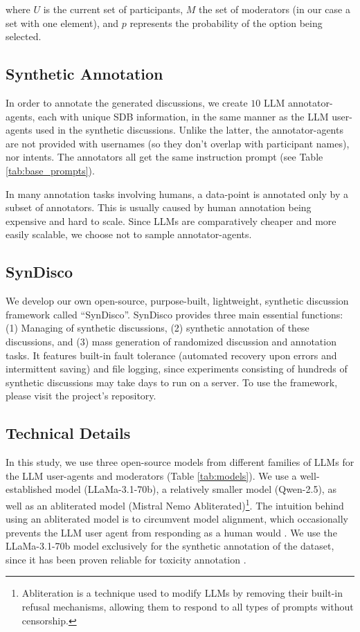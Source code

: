 \noindent where $U$ is the current set of participants, $M$ the set of moderators (in our case a set with one element), and $p$ represents the probability of the option being selected.


\subsection{Synthetic Annotation}

In order to annotate the generated discussions, we create $10$ \ac{LLM} annotator-agents, each with unique \ac{SDB} information, in the same manner as the \ac{LLM} user-agents used in the synthetic discussions. Unlike the latter, the annotator-agents are not provided with usernames (so they don't overlap with participant names), nor intents. The annotators all get the same instruction prompt (see Table \ref{tab:base_prompts}).

In many annotation tasks involving humans, a data-point is annotated only by a subset of annotators. This is usually caused by human annotation being expensive and hard to scale. Since \acp{LLM} are comparatively cheaper and more easily scalable, we choose not to sample annotator-agents.


\subsection{SynDisco}

We develop our own open-source, purpose-built, lightweight, synthetic discussion framework called “SynDisco”. SynDisco provides three main essential functions: (1) Managing of synthetic discussions, (2) synthetic annotation of these discussions, and (3) mass generation of randomized discussion and annotation tasks. It features built-in fault tolerance (automated recovery upon errors and intermittent saving) and file logging, since experiments consisting of hundreds of synthetic discussions may take days to run on a server. To use the framework, please visit the project's repository\projectlink.

\subsection{Technical Details}
\label{ssec:experimental:technical}

In this study, we use three open-source models from different families of \acp{LLM} for the \ac{LLM} user-agents and moderators (Table \ref{tab:models}). We use a well-established model (LLaMa-3.1-70b), a relatively smaller model (Qwen-2.5), as well as an abliterated model (Mistral Nemo Abliterated)\footnote{Abliteration is a technique used to modify \acp{LLM} by removing their built-in refusal mechanisms, allowing them to respond to all types of prompts without censorship.}. The intuition behind using an abliterated model is to circumvent model alignment, which occasionally prevents the \ac{LLM} user agent from responding as a human would \cite{Park2023GenerativeAI}. We use the LLaMa-3.1-70b model exclusively for the synthetic annotation of the dataset, since it has been proven reliable for toxicity annotation \cite{koh-etal-2024-llms}. 

